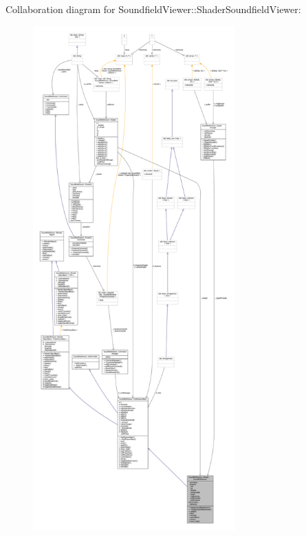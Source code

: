 Collaboration diagram for Soundfield\-Viewer\-:\-:Shader\-Soundfield\-Viewer\-:
\nopagebreak
\begin{figure}[H]
\begin{center}
\leavevmode
\includegraphics[height=550pt]{da/d7c/classSoundfieldViewer_1_1ShaderSoundfieldViewer__coll__graph}
\end{center}
\end{figure}
